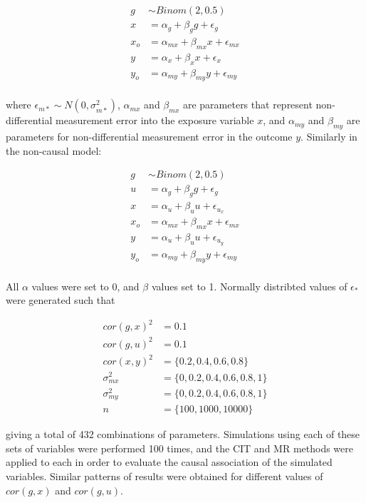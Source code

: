 \documentclass[]{article}
\begin{document}
\[
\begin{aligned}
g & \sim Binom(2, 0.5) \\
x & = \alpha_g + \beta_g g + \epsilon_g \\
x_o & = \alpha_{mx} + \beta_{mx} x + \epsilon_{mx} \\
y & = \alpha_x + \beta_x x + \epsilon_x \\
y_o & = \alpha_{my} + \beta_{my} y + \epsilon_{my} \\
\end{aligned}
\]

where \(\epsilon_{m*} \sim N(0, \sigma^2_{m*})\), \(\alpha_{mx}\) and
\(\beta_{mx}\) are parameters that represent non-differential
measurement error into the exposure variable \(x\), and \(\alpha_{my}\)
and \(\beta_{my}\) are parameters for non-differential measurement error
in the outcome \(y\). Similarly in the non-causal model:

\[
\begin{aligned}
g & \sim Binom(2, 0.5) \\
u & = \alpha_g + \beta_g g + \epsilon_g \\
x & = \alpha_u + \beta_u u + \epsilon_{u_x} \\
x_o & = \alpha_{mx} + \beta_{mx} x + \epsilon_{mx} \\
y & = \alpha_u + \beta_u u + \epsilon_{u_y} \\
y_o & = \alpha_{my} + \beta_{my} y + \epsilon_{my} \\
\end{aligned}
\]

All \(\alpha\) values were set to 0, and \(\beta\) values set to 1.
Normally distribted values of \(\epsilon_*\) were generated such that

\[
\begin{aligned}
cor(g, x)^2 & = 0.1 \\
cor(g, u)^2 & = 0.1 \\
cor(x, y)^2 & = \{0.2, 0.4, 0.6, 0.8\} \\
\sigma^2_{mx} & = \{0, 0.2, 0.4, 0.6, 0.8, 1\} \\
\sigma^2_{my} & = \{0, 0.2, 0.4, 0.6, 0.8, 1\} \\
n & = \{100, 1000, 10000\}
\end{aligned}
\]

giving a total of 432 combinations of parameters. Simulations using each
of these sets of variables were performed 100 times, and the CIT and MR
methods were applied to each in order to evaluate the causal association
of the simulated variables. Similar patterns of results were obtained
for different values of \(cor(g, x)\) and \(cor(g, u)\).
\end{document}
